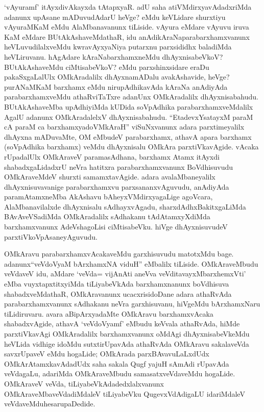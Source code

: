 \begin{artha}
`vAyuramf' itAyxdivAkayxda tAtapxyaR. adU saha atiVMdirxyavAdadxriMda adanunx upAsane mADuvudAdarU heVge? eMdu keVLidare shurxtiyu vAyuraMKaM eMdu AlaMbanavanunx tiLiside. vAyura eMdare vAyuvu iruva KaM eMdare BUtAkAshaveMdathaR, idu anAdikAraNaparabarxhamxvanunx heVLuvudilalxveMdu kwravAyxyaNiya putarxnu parxsididhx baladiMda heVLiruvanu. hAgAdare kAraNabarxhamxneMdu dhAyxnisabeVkoV? BUtAkAshaveMdu ciMtisabeVkoV? eMdu parxshinxsidare eraDu pakaSxgaLalUlx OMkAradalilx dhAyxnamADalu avakAshavide, heVge? purANaMKaM barxhamx eMdu nirupAdhikavAda kAraNa anAdiyAda parabarxhamxveMdu athaRviTaTxre adanUnx OMkAradalilx dhAyxnisabahudu. BUtAkAshaveMba upAdhiyiMda kUDida soVpAdhika parabarxhamxveMdalilx AgalU adanunx OMkAradalelxV dhAyxnisabahudu. ``EtadevxYsatayxM paraM cA paraM ca barxhamxyadoVMkAraH'' viSuNxvanunx adara parxtimeyalilx dhAyxna mADuvaMte, OM eMbudeV parabarxhamx, athavA apara barxhamx (soVpAdhika barxhamx) veMdu dhAyxnisalu OMkAra parxtiVkavAgide. vAcaka rUpadalUlx OMkAraveV paramasAdhana, barxhamx Atamx itAyxdi shabadxgaLidadxrU neVra hatitxra parabarxhamxvanunx BoVdhisuvudu OMkAraveMdeV shurxti samamxtavAgide. adara avalaMbaneyalilx dhAyxnisuvavanige parabarxhamxvu parxsananxvAguvudu, anAdiyAda paramAtamxneMba AkAshavu bAheyxVMdirxyagaLige agoVcara, AlaMbanavilalxde dhAyxnisalu sAdhayxvAgadu, sharxdAdhxBakitxgaLiMda BAvAveVSadiMda OMkAradalilx sAdhakanu tAdAtamxyXdiMda barxhamxvanunx AdeVshagoLisi ciMtisabeVku. hiVge dhAyxnisuvudeV parxtiVkoVpAsaneyAguvudu.
\end{artha}

\begin{artha}
OMkAravu  parabarxhamxvAcakaveMdu garxhisuvudu matotxMdu bage. adanunx\break  ``veVdoV\s yaM bArxhamxNA viduH'' eMbalilx tiLiside. OMkAraveMbudu veVdaveV idu, aMdare `veVda= vijAnAti aneVva veVditavayxMbarxhemxVti' eMba vuyxtapxtitxyiMda tiLiyabeVkAda barxhamxnanunx boVdhisuva shabadxveMdathaR, OMkAravanunx ucacxrisidoDane adara athaRvAda parabarxhamxvanunx sAdhakanu neVra garxhisuvanu, hiVgeMdu bArxhamxNaru tiLidiruvaru. avara aBipArxyadaMte OMkAravu barxhamxvAcaka shabadxvAgide, athavA `veVdoV\s yamf' eMbudu keVvala athaRvAda, hiMde parxtiVkavAgi OMkAradalilx barxhamxvanunx oMdAgi dhAyxnisabeVkeMdu heVLida vidhige idoMdu sutxtirUpavAda athaRvAda OMkAravu sakalaveVda savxrUpaveV eMdu hogaLide; OMkArada parxBAvavuLaLxdUdx OMkArAtamxkavAdadUdx saha sakala Qugf yajuH sAmAdi rUpavAda veVdagaLu, adariMda OMkAraveMbudu samasatxveVdaveMdu hogaLide. OMkAraveV veVda, tiLiyabeVkAdadedxlalxvanunx OMkAraveMba\break veVdadiMdaleV tiLiyabeVku  QugevxVdAdigaLU idariMdaleV veVdaveMdu\break hesarupaDedide.
\end{artha}

